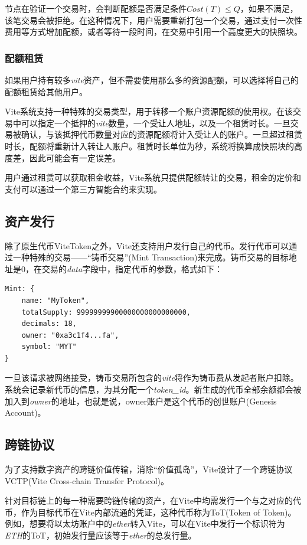 \documentclass[UTF8,nofonts]{ctexart}
\begin{document}
\begin{multicols}{2}
节点在验证一个交易时，会判断配额是否满足条件$Cost(T) \leq Q$，如果不满足，该笔交易会被拒绝。在这种情况下，用户需要重新打包一个交易，通过支付一次性费用等方式增加配额，或者等待一段时间，在交易中引用一个高度更大的快照块。

\subsubsection{配额租赁}
如果用户持有较多\textit{vite}资产，但不需要使用那么多的资源配额，可以选择将自己的配额租赁给其他用户。

Vite系统支持一种特殊的交易类型，用于转移一个账户资源配额的使用权。在该交易中可以指定一个抵押的\textit{vite}数量，一个受让人地址，以及一个租赁时长。一旦交易被确认，与该抵押代币数量对应的资源配额将计入受让人的账户。一旦超过租赁时长，配额将重新计入转让人账户。租赁时长单位为秒，系统将换算成快照块的高度差，因此可能会有一定误差。

用户通过租赁可以获取租金收益，Vite系统只提供配额转让的交易，租金的定价和支付可以通过一个第三方智能合约来实现。

\subsection{资产发行}
除了原生代币ViteToken之外，Vite还支持用户发行自己的代币。发行代币可以通过一种特殊的交易——“铸币交易”(Mint Transaction)来完成。铸币交易的目标地址是0，在交易的\textit{data}字段中，指定代币的参数，格式如下：
\begin{verbatim}
Mint: {
    name: "MyToken",
   	totalSupply: 99999999900000000000000000,
   	decimals: 18,
   	owner: "0xa3c1f4...fa",
    symbol: "MYT"
}
\end{verbatim}

一旦该请求被网络接受，铸币交易所包含的\textit{vite}将作为铸币费从发起者账户扣除。系统会记录新代币的信息，为其分配一个\textit{token\_id}。新生成的代币全部余额都会被加入到\textit{owner}的地址，也就是说，owner账户是这个代币的创世账户(Genesis Account)。

\subsection{跨链协议}
为了支持数字资产的跨链价值传输，消除“价值孤岛”，Vite设计了一个跨链协议VCTP(Vite Cross-chain Transfer Protocol)。

针对目标链上的每一种需要跨链传输的资产，在Vite中均需发行一个与之对应的代币，作为目标代币在Vite内部流通的凭证，这种代币称为ToT(Token of Token)。例如，想要将以太坊账户中的\textit{ether}转入Vite，可以在Vite中发行一个标识符为\textit{ETH}的ToT，初始发行量应该等于\textit{ether}的总发行量。


\end{multicols}
\end{document}
